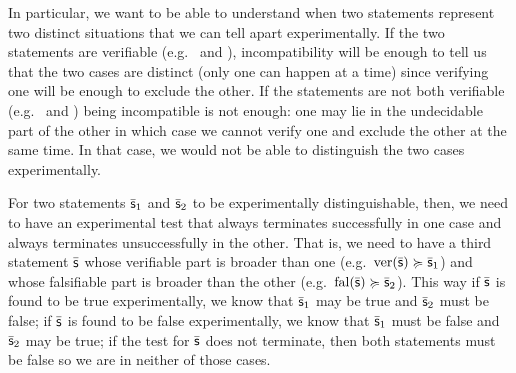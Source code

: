 \documentclass[11pt,letterpaper,fleqn]{memoir} %
\begin{document}
In particular, we want to be able to understand when two statements represent two distinct situations that we can tell apart experimentally. If the two statements are verifiable (e.g.~ and ), incompatibility will be enough to tell us that the two cases are distinct (only one can happen at a time) since verifying one will be enough to exclude the other. If the statements are not both verifiable (e.g.~ and ) being incompatible is not enough: one may lie in the undecidable part of the other in which case we cannot verify one and exclude the other at the same time. In that case, we would not be able to distinguish the two cases experimentally.

For two statements $\bar{\mathsf{s}}_1$ and $\bar{\mathsf{s}}_2$ to be experimentally distinguishable, then, we need to have an experimental test that always terminates successfully in one case and always terminates unsuccessfully in the other. That is, we need to have a third statement $\bar{\mathsf{s}}$ whose verifiable part is broader than one (e.g.~$\operatorname{ver}(\bar{\mathsf{s}}) \succcurlyeq \bar{\mathsf{s}}_1$) and whose falsifiable part is broader than the other (e.g.~$\operatorname{fal}(\bar{\mathsf{s}}) \succcurlyeq \bar{\mathsf{s}}_2$). This way if $\bar{\mathsf{s}}$ is found to be true experimentally, we know that $\bar{\mathsf{s}}_1$ may be true and $\bar{\mathsf{s}}_2$ must be false; if $\bar{\mathsf{s}}$ is found to be false experimentally, we know that $\bar{\mathsf{s}}_1$ must be false and $\bar{\mathsf{s}}_2$ may be true; if the test for $\bar{\mathsf{s}}$ does not terminate, then both statements must be false so we are in neither of those cases.
\end{document}
